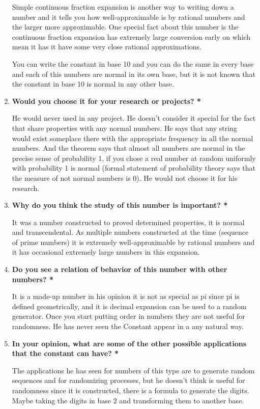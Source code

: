 \documentclass{report}
\begin{document}
\begin{enumerate}
Simple continuous fraction expansion is another way to writing down a number and it tells you how well-approximable is by rational numbers and the larger more approximable. One special fact about this number is the continuous fraction expansion has extremely large conversion early on which mean it has it have some very close rational approximations.

You can write the constant in base 10 and you can do the same in every base and each of this numbers are normal in its own base, but it is not known that the constant in base 10 is normal in any other base.

\item\textbf{Would you choose it for your research or projects?\color{red} *}

He would never used in any project. He doesn’t consider it special for the fact that share properties with any normal numbers. He says that any string would exist someplace there with the appropriate frequency in all the normal numbers. And the theorem says that almost all numbers are normal in the precise sense of probability 1, if you chose a real number at random uniformly with probability 1 is normal (formal statement of probability theory says that the measure of not normal numbers is 0). He would not choose it for his research.

\item\textbf{Why do you think the study of this number is important?\color{red} *}

It was a number constructed to proved determined properties, it is normal and transcendental. As multiple numbers constructed at the time (sequence of prime numbers) it is extremely well-approximable by rational numbers and it has occasional extremely large numbers in this expansion.

\item\textbf{Do you see a relation of behavior of this number with other numbers?\color{red} *}

It is a made-up number in his opinion it is not as special as pi since pi is defined geometrically, and it is decimal expansion can be used to a random generator. Once you start putting order in numbers they are not useful for randomness. He has never seen the Constant appear in a any natural way.  

\item\textbf{In your opinion, what are some of the other possible applications that the constant can have?\color{red} *}

The applications he has seen for numbers of this type are to generate random sequences and for randomizing processes, but he doesn’t think is useful for randomness since it is constructed, there is a formula to generate the digits. Maybe taking the digits in base 2 and transforming them to another base.


\end{enumerate}
\end{document}
